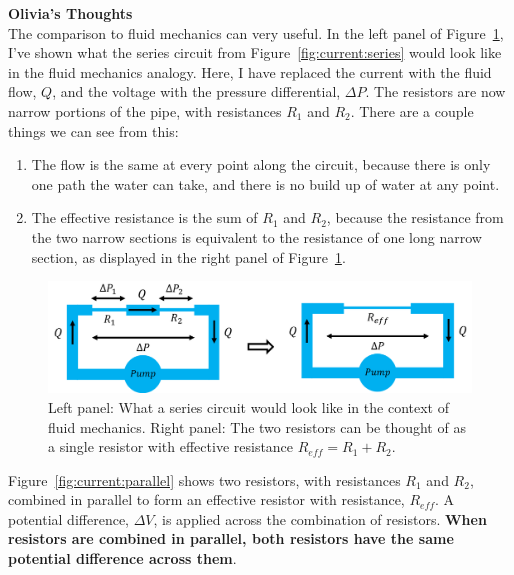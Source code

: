 \begin{framed}
\textbf{Olivia's Thoughts}\\
The comparison to fluid mechanics can very useful. In the left panel of Figure~\ref{fig:current:waterseries}, I've shown what the series circuit from Figure~\ref{fig:current:series} would look like in the fluid mechanics analogy. Here, I have replaced the current with the fluid flow, $Q$, and the voltage with the pressure differential, $\Delta P$. The resistors are now narrow portions of the pipe, with resistances $R_1$ and $R_2$. There are a couple things we can see from this:

\begin{enumerate}
\item The flow is the same at every point along the circuit, because there is only one path the water can take, and there is no build up of water at any point.
\item The effective resistance is the sum of $R_1$ and $R_2$, because the resistance from the two narrow sections is equivalent to the resistance of one long narrow section, as displayed in the right panel of Figure~\ref{fig:current:waterseries}.
\end{enumerate}

\begin{figure}[!htbp]
\centering
\includegraphics[width=0.7\linewidth]{files/waterseries-7eef2efa94ac989eef10ef8de3522596.png}
\caption[]{Left panel: What a series circuit would look like in the context of fluid mechanics. Right panel: The two resistors can be thought of as a single resistor with effective resistance $R_{eff}=R_1+R_2$.}
\label{fig:current:waterseries}
\end{figure}
\end{framed}

Figure~\ref{fig:current:parallel} shows two resistors, with resistances $R_1$ and $R_2$, combined in parallel to form an effective resistor with resistance, $R_{eff}$. A potential difference, $\Delta V$, is applied across the combination of resistors. \textbf{When resistors are combined in parallel, both resistors have the same potential difference across them}.

